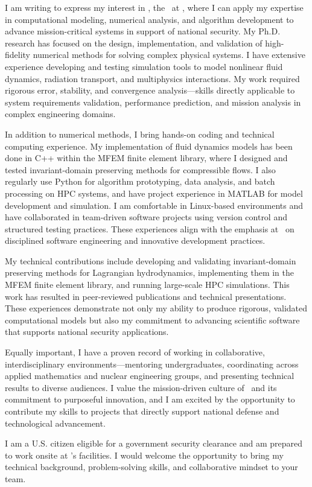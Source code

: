 I am writing to express my interest in 
\ifdefempty{\jobtitle}
  {\company,} %
  {the \jobtitle\ at \company,} %
where I can apply my expertise in computational modeling, numerical analysis, and algorithm development to advance mission-critical systems in support of national security.
My Ph.D. research has focused on the design, implementation, and validation of high-fidelity numerical methods for solving complex physical systems. I have extensive experience developing and testing simulation tools to model nonlinear fluid dynamics, radiation transport, and multiphysics interactions. My work required rigorous error, stability, and convergence analysis—skills directly applicable to system requirements validation, performance prediction, and mission analysis in complex engineering domains.

In addition to numerical methods, I bring hands-on coding and technical computing experience. My implementation of fluid dynamics models has been done in C++ within the MFEM finite element library, where I designed and tested invariant-domain preserving methods for compressible flows. I also regularly use Python for algorithm prototyping, data analysis, and batch processing on HPC systems, and have project experience in MATLAB for model development and simulation. I am comfortable in Linux-based environments and have collaborated in team-driven software projects using version control and structured testing practices. These experiences align with the emphasis at \company\ on disciplined software engineering and innovative development practices.

My technical contributions include developing and validating invariant-domain preserving methods for Lagrangian hydrodynamics, implementing them in the MFEM finite element library, and running large-scale HPC simulations. This work has resulted in peer-reviewed publications and technical presentations. These experiences demonstrate not only my ability to produce rigorous, validated computational models but also my commitment to advancing scientific software that supports national security applications.

Equally important, I have a proven record of working in collaborative, interdisciplinary environments—mentoring undergraduates, coordinating across applied mathematics and nuclear engineering groups, and presenting technical results to diverse audiences. I value the mission-driven culture of \company\ and its commitment to purposeful innovation, and I am excited by the opportunity to contribute my skills to projects that directly support national defense and technological advancement.

I am a U.S. citizen eligible for a government security clearance and am prepared to work onsite at \company's facilities. I would welcome the opportunity to bring my technical background, problem-solving skills, and collaborative mindset to your team.

